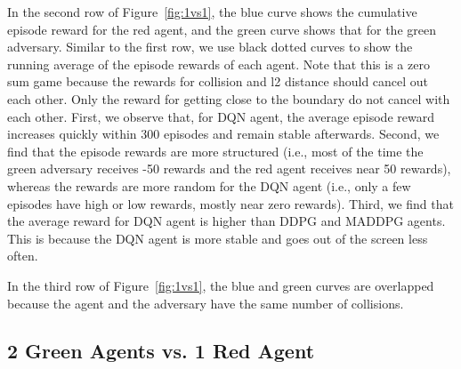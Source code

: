 In the second row of Figure~\ref{fig:1vs1}, the blue curve shows the cumulative
episode reward for the red agent, and the green curve shows that for the green
adversary. Similar to the first row, we use black dotted curves to show the
running average of the episode rewards of each agent. Note that this is a zero
sum game because the rewards for collision and l2 distance should cancel out
each other. Only the reward for getting close to the boundary do not cancel
with each other. First, we observe that,
for DQN agent, the average episode reward increases quickly within 300
episodes and remain stable afterwards. Second, we find that the episode rewards
are more structured (i.e., most of the time the green adversary receives -50
rewards and the red agent receives near 50 rewards), whereas the rewards are
more random for the DQN agent (i.e., only a few episodes have high or low
rewards, mostly near zero rewards). Third, we find that the average reward for
DQN agent is higher than DDPG and MADDPG agents. This is because the DQN agent
is more stable and goes out of the screen less often.

In the third row of Figure~\ref{fig:1vs1}, the blue and green curves are
overlapped because the agent and the adversary have the same number of
collisions.

\subsection{2 Green Agents vs. 1 Red Agent}
\label{sec:experiment:1vs2}

